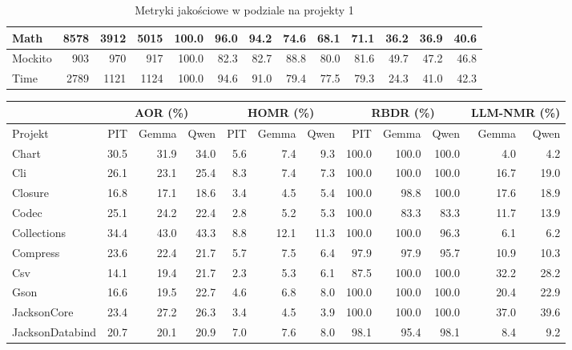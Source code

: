 \documentclass[12pt,a4paper,oldfontcommands]{memoir}
\theoremstyle{plain}
\theoremstyle{definition}
\theoremstyle{remark}
\begin{document}
\begin{table}[H]
\begin{tabular}{|l|r|r|r|r|r|r|r|r|r||r|r|r|}
            Math & 8578 & 3912 & 5015 & 100.0 & 96.0 & 94.2 & 74.6 & 68.1 & 71.1 & 36.2 & 36.9 & 40.6 \\ \hline
            Mockito & 903 & 970 & 917 & 100.0 & 82.3 & 82.7 & 88.8 & 80.0 & 81.6 & 49.7 & 47.2 & 46.8 \\ \hline
            Time & 2789 & 1121 & 1124 & 100.0 & 94.6 & 91.0 & 79.4 & 77.5 & 79.3 & 24.3 & 41.0 & 42.3 \\ \hline
        \end{tabular}
        \caption{Metryki jakościowe w podziale na projekty 1}
        \label{tab:per_project_1}
    \end{table}

    \begin{table}[H]
        \centering
        \scriptsize
        \begin{tabular}{|l|r|r|r|r|r|r|r|r|r|r|r|}
            \hline
            & \multicolumn{3}{c||}{AOR (\%)} & \multicolumn{3}{c||}{HOMR (\%)} & \multicolumn{3}{c||}{RBDR (\%)} & \multicolumn{2}{c|}{LLM-NMR (\%)} \\ \hline
            Projekt & PIT & Gemma & Qwen & PIT & Gemma & Qwen & PIT & Gemma & Qwen & Gemma & Qwen \\ \hline
            Chart & 30.5 & 31.9 & 34.0 & 5.6 & 7.4 & 9.3 & 100.0 & 100.0 & 100.0 & 4.0 & 4.2 \\ \hline
            Cli & 26.1 & 23.1 & 25.4 & 8.3 & 7.4 & 7.3 & 100.0 & 100.0 & 100.0 & 16.7 & 19.0 \\ \hline
            Closure & 16.8 & 17.1 & 18.6 & 3.4 & 4.5 & 5.4 & 100.0 & 98.8 & 100.0 & 17.6 & 18.9 \\ \hline
            Codec & 25.1 & 24.2 & 22.4 & 2.8 & 5.2 & 5.3 & 100.0 & 83.3 & 83.3 & 11.7 & 13.9 \\ \hline
            Collections & 34.4 & 43.0 & 43.3 & 8.8 & 12.1 & 11.3 & 100.0 & 100.0 & 96.3 & 6.1 & 6.2 \\ \hline
            Compress & 23.6 & 22.4 & 21.7 & 5.7 & 7.5 & 6.4 & 97.9 & 97.9 & 95.7 & 10.9 & 10.3 \\ \hline
            Csv & 14.1 & 19.4 & 21.7 & 2.3 & 5.3 & 6.1 & 87.5 & 100.0 & 100.0 & 32.2 & 28.2 \\ \hline
            Gson & 16.6 & 19.5 & 22.7 & 4.6 & 6.8 & 8.0 & 100.0 & 100.0 & 100.0 & 20.4 & 22.9 \\ \hline
            JacksonCore & 23.4 & 27.2 & 26.3 & 3.4 & 4.5 & 3.9 & 100.0 & 100.0 & 100.0 & 37.0 & 39.6 \\ \hline
            JacksonDatabind & 20.7 & 20.1 & 20.9 & 7.0 & 7.6 & 8.0 & 98.1 & 95.4 & 98.1 & 8.4 & 9.2 \\ \hline

\end{tabular}
\end{table}
\end{document}

